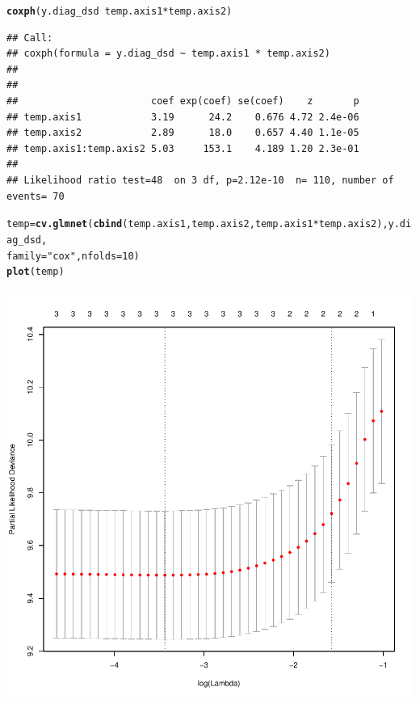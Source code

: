 \documentclass{article}\usepackage[]{graphicx}\usepackage[]{color}
\makeatletter
\def\maxwidth{ %
  \ifdim\Gin@nat@width>\linewidth
    \linewidth
  \else
    \Gin@nat@width
  \fi
}
\newcommand{\hlnum}[1]{\textcolor[rgb]{0.686,0.059,0.569}{#1}}%
\newcommand{\hlstr}[1]{\textcolor[rgb]{0.192,0.494,0.8}{#1}}%
\newcommand{\hlopt}[1]{\textcolor[rgb]{0,0,0}{#1}}%
\newcommand{\hlstd}[1]{\textcolor[rgb]{0.345,0.345,0.345}{#1}}%
\newcommand{\hlkwb}[1]{\textcolor[rgb]{0.69,0.353,0.396}{#1}}%
\newcommand{\hlkwc}[1]{\textcolor[rgb]{0.333,0.667,0.333}{#1}}%
\newcommand{\hlkwd}[1]{\textcolor[rgb]{0.737,0.353,0.396}{\textbf{#1}}}%
\newenvironment{kframe}{%
 \def\at@end@of@kframe{}%
 \ifinner\ifhmode%
  \def\at@end@of@kframe{\end{minipage}}%
  \begin{minipage}{\columnwidth}%
 \fi\fi%
 \def\FrameCommand##1{\hskip\@totalleftmargin \hskip-\fboxsep
 \colorbox{shadecolor}{##1}\hskip-\fboxsep
     \hskip-\linewidth \hskip-\@totalleftmargin \hskip\columnwidth}%
 \MakeFramed {\advance\hsize-\width
   \@totalleftmargin\z@ \linewidth\hsize
   \@setminipage}}%
 {\par\unskip\endMakeFramed%
 \at@end@of@kframe}
\newenvironment{knitrout}{}{} %
\makeatother
\begin{document}
\begin{knitrout}
\begin{kframe}\begin{alltt}
\hlkwd{coxph}\hlstd{(y.diag_dsd} \hlopt{~} \hlstd{temp.axis1} \hlopt{*} \hlstd{temp.axis2)}
\end{alltt}
\begin{verbatim}
## Call:
## coxph(formula = y.diag_dsd ~ temp.axis1 * temp.axis2)
## 
## 
##                       coef exp(coef) se(coef)    z       p
## temp.axis1            3.19      24.2    0.676 4.72 2.4e-06
## temp.axis2            2.89      18.0    0.657 4.40 1.1e-05
## temp.axis1:temp.axis2 5.03     153.1    4.189 1.20 2.3e-01
## 
## Likelihood ratio test=48  on 3 df, p=2.12e-10  n= 110, number of events= 70
\end{verbatim}
\begin{alltt}
\hlstd{temp} \hlkwb{=} \hlkwd{cv.glmnet}\hlstd{(}\hlkwd{cbind}\hlstd{(temp.axis1, temp.axis2, temp.axis1} \hlopt{*} \hlstd{temp.axis2), y.diag_dsd,}
    \hlkwc{family} \hlstd{=} \hlstr{"cox"}\hlstd{,} \hlkwc{nfolds} \hlstd{=} \hlnum{10}\hlstd{)}
\hlkwd{plot}\hlstd{(temp)}
\end{alltt}
\end{kframe}

{\centering \includegraphics[width=\maxwidth]{figure/metagene-pairs-11} 

}



\end{knitrout}
\end{document}
